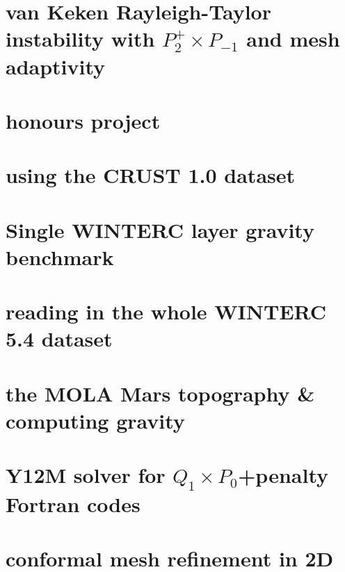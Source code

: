 \documentclass[a4paper,11pt]{report}
\begin{document}
\chapter{van Keken \etal Rayleigh-Taylor instability with $P_2^+\times P_{-1}$ and mesh adaptivity \label{f95}}

\chapter{honours project \label{f96}}

\chapter{using the CRUST 1.0 dataset \label{f97}}

\chapter{Single WINTERC layer gravity benchmark \label{f98}}

\chapter{reading in the whole WINTERC 5.4 dataset \label{f99}}

\chapter{the MOLA Mars topography \& computing gravity \label{f100}}

\chapter{Y12M solver for $Q_1\times P_0$+penalty Fortran codes \label{f101}}

\chapter{conformal mesh refinement in 2D \label{f102}}
\end{document}

